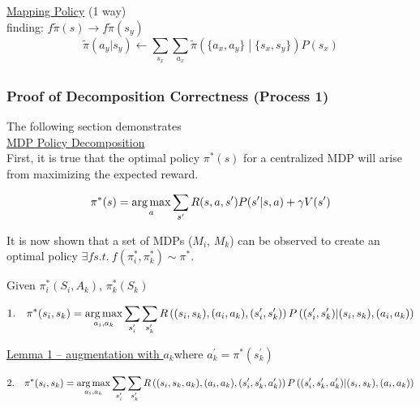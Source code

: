 \underline{Mapping Policy} (1 way)\\

finding: $f\tilde{\pi}(s)\to f\tilde{\pi}(s_y)$\\

\begin{equation*}
\tilde{\pi}(a_y|s_y) \leftarrow \sum_{s_x}\sum_{a_x}\tilde{\pi}\left( \{ a_x, a_y \} \middle|  \{ s_x, s_y \} \right)P(s_x) 
\end{equation*}

\newpage

\subsection{}

\subsubsection{Proof of Decomposition Correctness (Process 1)}

The following section demonstrates\\

\underline{MDP Policy Decomposition}\\

First, it is true that the optimal policy $\pi^\ast(s)$ for a centralized MDP will arise from maximizing the expected reward.

\begin{equation*}
\pi^\ast(s) = \operatorname*{arg\,max}_{a} \sum_{s^\prime} R(s,a,s^\prime) P(s^\prime |s, a) + \gamma V(s^\prime)
\end{equation*}

It is now shown that a set of MDPs ($M_i$, $M_k$) can be observed to create an optimal policy $\exists f s.t.\ f\left( \pi^\ast_i, \pi^\ast_k \right) \sim \pi^\ast$.

Given $\pi^\ast_i(S_i, A_k)$, $\pi^\ast_k(S_k)$

\begin{equation*}
1.\quad \pi^\ast(s_i,s_k) = \operatorname*{arg\,max}_{a_i, a_k} \sum_{s^\prime_i} \sum_{s^\prime_k} R\left( (s_i,s_k),(a_i,a_k),(s^\prime_i,s^\prime_k)\right) P\left( (s^\prime_i, s^\prime_k) \middle| (s_i, s_k), (a_i, a_k)  \right)
\end{equation*}

\textasteriskcentered \quad \underline{Lemma 1 -- augmentation with $a_k$}\quad where $a^\prime_k=\pi^\ast(s^\prime_k)$

\begin{equation*}
2.\quad\pi^\ast(s_i, s_k) = \operatorname*{arg\,max}_{a_i, a_k} \sum_{s^\prime_i} \sum_{s^\prime_k} R\left((s_i, s_k, a_k), (a_i,a_k),(s^\prime_i,s^\prime_k,a^\prime_k) \right) P\left( (s^\prime_i, s^\prime_k, a^\prime_k) \middle| (s_i, s_k), (a_i,a_k) \right) 
\end{equation*}

